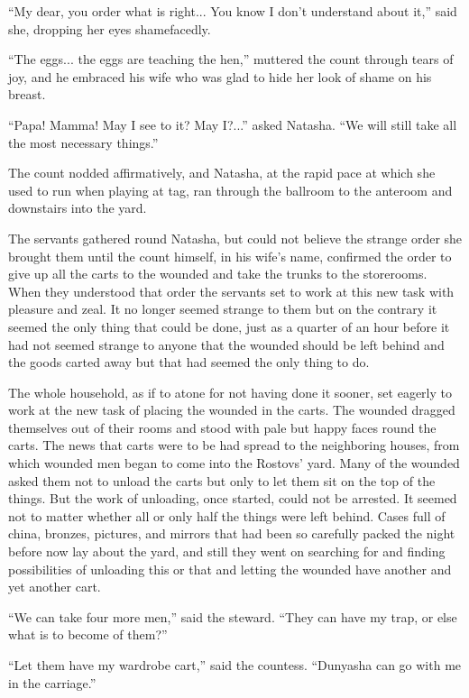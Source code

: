 ``My dear, you order what is right... You know I don't understand
about it,'' said she, dropping her eyes shamefacedly.

``The eggs... the eggs are teaching the hen,'' muttered the count
through tears of joy, and he embraced his wife who was glad to
hide her look of shame on his breast.

``Papa! Mamma! May I see to it? May I?...'' asked Natasha. ``We
will still take all the most necessary things.''

The count nodded affirmatively, and Natasha, at the rapid pace at
which she used to run when playing at tag, ran through the
ballroom to the anteroom and downstairs into the yard.

The servants gathered round Natasha, but could not believe the
strange order she brought them until the count himself, in his
wife's name, confirmed the order to give up all the carts to the
wounded and take the trunks to the storerooms. When they
understood that order the servants set to work at this new task
with pleasure and zeal. It no longer seemed strange to them but
on the contrary it seemed the only thing that could be done, just
as a quarter of an hour before it had not seemed strange to
anyone that the wounded should be left behind and the goods
carted away but that had seemed the only thing to do.

The whole household, as if to atone for not having done it
sooner, set eagerly to work at the new task of placing the
wounded in the carts. The wounded dragged themselves out of their
rooms and stood with pale but happy faces round the carts. The
news that carts were to be had spread to the neighboring houses,
from which wounded men began to come into the Rostovs' yard. Many
of the wounded asked them not to unload the carts but only to let
them sit on the top of the things. But the work of unloading,
once started, could not be arrested. It seemed not to matter
whether all or only half the things were left behind. Cases full
of china, bronzes, pictures, and mirrors that had been so
carefully packed the night before now lay about the yard, and
still they went on searching for and finding possibilities of
unloading this or that and letting the wounded have another and
yet another cart.

``We can take four more men,'' said the steward. ``They can have
my trap, or else what is to become of them?''

``Let them have my wardrobe cart,'' said the countess. ``Dunyasha
can go with me in the carriage.''

